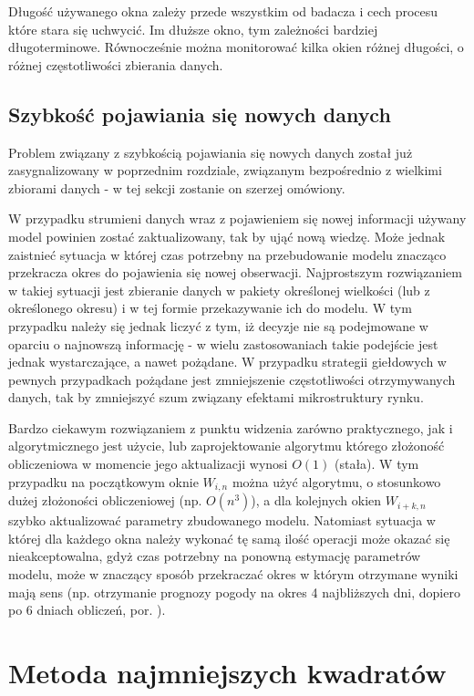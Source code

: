 \documentclass[man,mfu]{mgrwms}
\begin{document}
Długość używanego okna zależy przede wszystkim od badacza i cech procesu które stara się uchwycić. Im dłuższe okno, tym zależności bardziej długoterminowe. Równocześnie można monitorować kilka okien różnej długości, o różnej częstotliwości zbierania danych.

\subsection{Szybkość pojawiania się nowych danych}

Problem związany z szybkością pojawiania się nowych danych został już zasygnalizowany w poprzednim rozdziale, związanym bezpośrednio z wielkimi zbiorami danych - w tej sekcji zostanie on szerzej omówiony.

W przypadku strumieni danych wraz z pojawieniem się nowej informacji używany model powinien zostać zaktualizowany, tak by ująć nową wiedzę. Może jednak zaistnieć sytuacja w której czas potrzebny na przebudowanie modelu znacząco przekracza okres do pojawienia się nowej obserwacji. Najprostszym rozwiązaniem w takiej sytuacji jest zbieranie danych w pakiety określonej wielkości (lub z określonego okresu) i w tej formie przekazywanie ich do modelu. W tym przypadku należy się jednak liczyć z tym, iż decyzje nie są podejmowane w oparciu o najnowszą informację - w wielu zastosowaniach takie podejście jest jednak wystarczające, a nawet pożądane. W przypadku strategii giełdowych w pewnych przypadkach pożądane jest zmniejszenie częstotliwości otrzymywanych danych, tak by zmniejszyć szum związany efektami mikrostruktury rynku\cite{doman}.

Bardzo ciekawym rozwiązaniem z punktu widzenia zarówno praktycznego, jak i algorytmicznego jest użycie, lub zaprojektowanie algorytmu którego złożoność obliczeniowa w momencie jego aktualizacji wynosi $O(1)$ (stała). W tym przypadku na początkowym oknie $W_{i,n}$ można użyć algorytmu, o stosunkowo dużej złożoności obliczeniowej (np. $O(n^3)$), a dla kolejnych okien $W_{i+k,n}$ szybko aktualizować parametry zbudowanego modelu. Natomiast sytuacja w której dla każdego okna należy wykonać tę samą ilość operacji może okazać się nieakceptowalna, gdyż czas potrzebny na ponowną estymację parametrów modelu, może w znaczący sposób przekraczać okres w którym otrzymane wyniki mają sens (np. otrzymanie prognozy pogody na okres 4 najbliższych dni, dopiero po 6 dniach obliczeń, por. \cite{Karbowski2009}).


\section{Metoda najmniejszych kwadratów}
\end{document}
